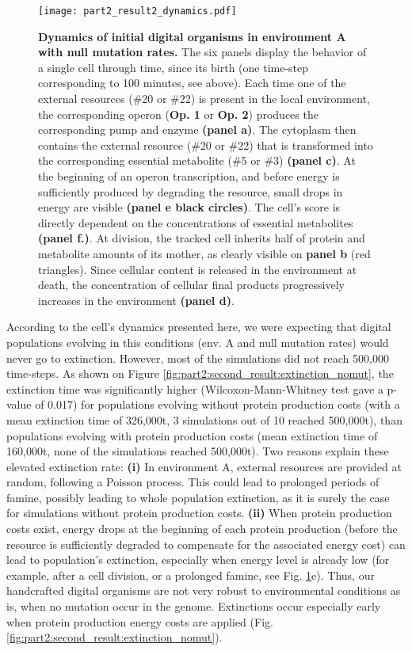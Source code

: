 \begin{figure}[!h]
\centering
\texttt{[image: part2\_result2\_dynamics.pdf]}
\caption[Dynamics of initial digital organisms in environment A with null mutation rates.]
{\textbf{Dynamics of initial digital organisms in environment A with null mutation rates.}
The six panels display the behavior of a single cell through time, since its birth (one time-step corresponding to 100 minutes, see above). Each time one of the external resources (\#20 or \#22) is present in the local environment, the corresponding operon (\textbf{Op. 1} or \textbf{Op. 2}) produces the corresponding pump and enzyme \textbf{(panel a)}. The cytoplasm then contains the external resource (\#20 or \#22) that is transformed into the corresponding essential metabolite (\#5 or \#3) \textbf{(panel c)}. At the beginning of an operon transcription, and before energy is sufficiently produced by degrading the resource, small drops in energy are visible \textbf{(panel e black circles)}. The cell's score is directly dependent on the concentrations of essential metabolites \textbf{(panel f.)}. At division, the tracked cell inherits half of protein and metabolite amounts of its mother, as clearly visible on \textbf{panel b} (red triangles). Since cellular content is released in the environment at death, the concentration of cellular final products progressively increases in the environment \textbf{(panel d)}.
}
\label{fig:part2:second_result:dynamics}
\end{figure}

According to the cell's dynamics presented here, we were expecting that digital populations evolving in this conditions (env. A and null mutation rates) would never go to extinction. However, most of the simulations did not reach 500,000 time-steps. As shown on Figure \ref{fig:part2:second_result:extinction_nomut}, the extinction time was significantly higher (Wilcoxon-Mann-Whitney test gave a p-value of 0.017) for populations evolving without protein production costs (with a mean extinction time of 326,000t, 3 simulations out of 10 reached 500,000t), than populations evolving with protein production costs (mean extinction time of 160,000t, none of the simulations reached 500,000t). Two reasons explain these elevated extinction rate: \textbf{(i)} In environment A, external resources are provided at random, following a Poisson process. This could lead to prolonged periods of famine, possibly leading to whole population extinction, as it is surely the case for simulations without protein production costs. \textbf{(ii)} When protein production costs exist, energy drops at the beginning of each protein production (before the resource is sufficiently degraded to compensate for the associated energy cost) can lead to population's extinction, especially when energy level is already low (for example, after a cell division, or a prolonged famine, see Fig. \ref{fig:part2:second_result:dynamics}e). Thus, our handcrafted digital organisms are not very robust to environmental conditions as is, when no mutation occur in the genome. Extinctions occur especially early when protein production energy costs are applied (Fig. \ref{fig:part2:second_result:extinction_nomut}).

